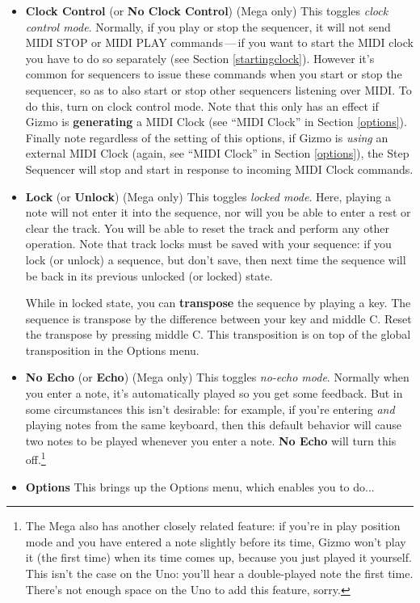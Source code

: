 \documentclass{article}
\begin{document}
\begin{itemize}
\item {\bf Clock Control} (or {\bf No Clock Control}) (Mega only) \quad This toggles {\it clock control mode}.  Normally, if you play or stop the sequencer, it will not send MIDI STOP or MIDI PLAY commands\,---\,if you want to start the MIDI clock you have to do so separately (see Section \ref{startingclock}).  However it's common for sequencers to issue these commands when you start or stop the sequencer, so as to also start or stop other sequencers listening over MIDI.  To do this, turn on clock control mode.  Note that this only has an effect if Gizmo is {\bf generating} a MIDI Clock (see ``MIDI Clock'' in Section \ref{options}).  Finally note regardless of the setting of this options, if Gizmo is {\it using} an external MIDI Clock (again, see ``MIDI Clock'' in Section \ref{options}), the Step Sequencer will stop and start in response to incoming MIDI Clock commands.
\item {\bf Lock} (or {\bf Unlock}) (Mega only) \quad This toggles {\it locked mode}.  Here, playing a note will not enter it into the sequence, nor will you be able to enter a rest or clear the track.  You will be able to reset the track and perform any other operation.  Note that track locks must be saved with your sequence: if you lock (or unlock) a sequence, but don't save, then next time the sequence will be back in its previous unlocked (or locked) state.

While in locked state, you can {\bf transpose} the sequence by playing a key.  The sequence is transpose by the difference between your key and middle C.  Reset the transpose by pressing middle C.  This transposition is on top of the global transposition in the Options menu.

\item {\bf No Echo} (or {\bf Echo}) (Mega only) \quad This toggles {\it no-echo mode}.  Normally when you enter a note, it's automatically played so you get some feedback.  But in some circumstances this isn't desirable: for example, if you're entering {\it and} playing notes from the same keyboard, then this default behavior will cause two notes to be played whenever you enter a note.  {\bf No Echo} will turn this off.\footnote{The Mega also has another closely related feature: if you're in play position mode and you have entered a note slightly before its time, Gizmo won't play it (the first time) when its time comes up, because you just played it yourself.  This isn't the case on the Uno: you'll hear a double-played note the first time.  There's not enough space on the Uno to add this feature, sorry.}
\item {\bf Options} \quad This brings up the Options menu, which enables you to do...
\end{itemize}
\end{document}
